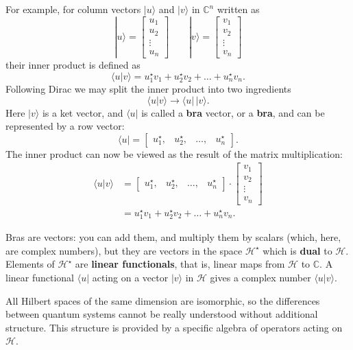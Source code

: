 \documentclass[fleqn]{article}
\newenvironment{idea}{\noindent}{\medskip}
\begin{document}
For example, for column vectors \(|u\rangle\) and \(|v\rangle\) in \(\mathbb{C}^n\) written as
\[
  |u\rangle
  = \begin{bmatrix}u_1\\u_2\\\vdots\\u_n\end{bmatrix}
  \qquad
  |v\rangle
  = \begin{bmatrix}v_1\\v_2\\\vdots\\v_n\end{bmatrix}
\]
their inner product is defined as
\[
  \langle u|v\rangle
  = u_1^\star v_1 + u_2^\star v_2+\ldots + u_n^\star v_n.
\]
Following Dirac we may split the inner product into two ingredients
\[
  \langle u|v\rangle
  \longrightarrow \langle u|\,|v\rangle.
\]
Here \(|v\rangle\) is a ket vector, and \(\langle u|\) is called a \textbf{bra} vector, or a \textbf{bra}, and can be represented by a row vector:
\[
  \langle u|
  = \begin{bmatrix}u_1^\star,&u_2^\star,&\ldots,&u_n^\star\end{bmatrix}.
\]
The inner product can now be viewed as the result of the matrix multiplication:
\[
  \begin{aligned}
    \langle u|v\rangle
    &= \begin{bmatrix}u_1^\star,&u_2^\star,&\ldots,&u_n^\star\end{bmatrix}
    \cdot \begin{bmatrix}v_1\\v_2\\\vdots\\v_n\end{bmatrix}
  \\&= u_1^\star v_1 + u_2^\star v_2 + \ldots + u_n^\star v_n.
  \end{aligned}
\]

Bras are vectors: you can add them, and multiply them by scalars (which, here, are complex numbers), but they are vectors in the space \({\mathcal{H}}^\star\) which is \textbf{dual} to \(\mathcal{H}\).
Elements of \({\mathcal{H}}^\star\) are \textbf{linear functionals}, that is, linear maps from \(\mathcal{H}\) to \(\mathbb{C}\).
A linear functional \(\langle u|\) acting on a vector \(|v\rangle\) in \(\mathcal{H}\) gives a complex number \(\langle u|v\rangle\).

\begin{idea}

All Hilbert spaces of the same dimension are isomorphic, so the differences between quantum systems cannot be really understood without additional structure. This structure is provided by a specific algebra of operators acting on \(\mathcal{H}\).

\end{idea}
\end{document}
